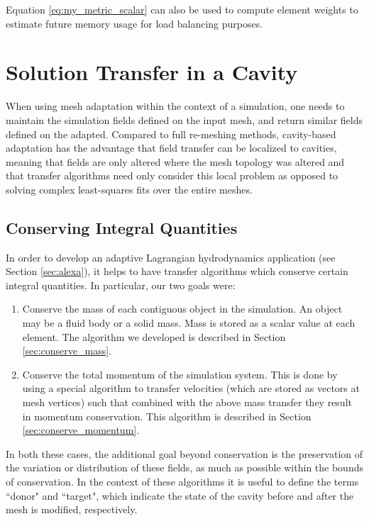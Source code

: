 Equation \ref{eq:my_metric_scalar} can also be used to compute element weights
to estimate future memory usage for load balancing purposes.

\section{Solution Transfer in a Cavity}

When using mesh adaptation within the context of a simulation,
one needs to maintain the simulation fields defined on the input mesh,
and return similar fields defined on the adapted.
Compared to full re-meshing methods, cavity-based adaptation has the
advantage that field transfer can be localized to cavities, meaning
that fields are only altered where the mesh topology was altered and
that transfer algorithms need only consider this local problem
as opposed to solving complex least-squares fits over the entire meshes.

\subsection{Conserving Integral Quantities}

In order to develop an adaptive Lagrangian hydrodynamics application
(see Section \ref{sec:alexa}), it helps to have transfer algorithms
which conserve certain integral quantities.
In particular, our two goals were:
\begin{enumerate}
\item Conserve the mass of each contiguous object in the simulation.
An object may be a fluid body or a solid mass.
Mass is stored as a scalar value at each element.
The algorithm we developed is described in Section \ref{sec:conserve_mass}.
\item Conserve the total momentum of the simulation system.
This is done by using a special algorithm to transfer velocities
(which are stored as vectors at mesh vertices) such that combined
with the above mass transfer they result in momentum conservation.
This algorithm is described in Section \ref{sec:conserve_momentum}.
\end{enumerate}
In both these cases, the additional goal beyond conservation is
the preservation of the variation or distribution of these fields,
as much as possible within the bounds of conservation.
In the context of these algorithms it is useful to define the terms
``donor" and ``target", which indicate the state of the cavity before
and after the mesh is modified, respectively.

